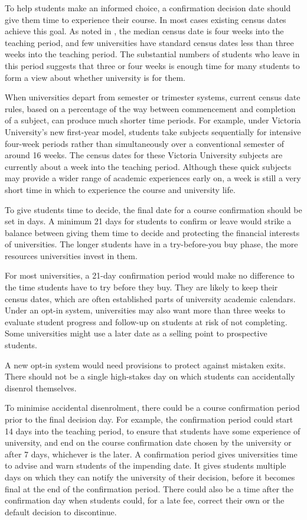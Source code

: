 To help students make an informed choice, a confirmation decision date should give them time to experience their course. In most cases existing census dates achieve this goal. As noted in , the median census date is four weeks into the teaching period, and few universities have standard census dates less than three weeks into the teaching period. The substantial numbers of students who leave in this period suggests that three or four weeks is enough time for many students to form a view about whether university is for them.

When universities depart from semester or trimester systems, current census date rules, based on a percentage of the way between commencement and completion of a subject, can produce much shorter time periods. For example, under Victoria University's new first-year model, students take subjects sequentially for intensive four-week periods rather than simultaneously over a conventional semester of around 16 weeks. The census dates for these Victoria University subjects are currently about a week into the teaching period. Although these quick subjects may provide a wider range of academic experiences early on, a week is still a very short time in which to experience the course and university life.

To give students time to decide, the final date for a course confirmation should be set in days. A minimum 21 days for students to confirm or leave would strike a balance between giving them time to decide and protecting the financial interests of universities. The longer students have in a try-before-you buy phase, the more resources universities invest in them.

For most universities, a 21-day confirmation period would make no difference to the time students have to try before they buy. They are likely to keep their census dates, which are often established parts of university academic calendars. Under an opt-in system, universities may also want more than three weeks to evaluate student progress and follow-up on students at risk of not completing. Some universities might use a later date as a selling point to prospective students.

A new opt-in system would need provisions to protect against mistaken exits. There should not be a single high-stakes day on which students can accidentally disenrol themselves.

To minimise accidental disenrolment, there could be a course confirmation period prior to the final decision day. For example, the confirmation period could start 14 days into the teaching period, to ensure that students have some experience of university, and end on the course confirmation date chosen by the university or after 7 days, whichever is the later. A confirmation period gives universities time to advise and warn students of the impending date. It gives students multiple days on which they can notify the university of their decision, before it becomes final at the end of the confirmation period. There could also be a time after the confirmation day when students could, for a late fee, correct their own or the default decision to discontinue.

